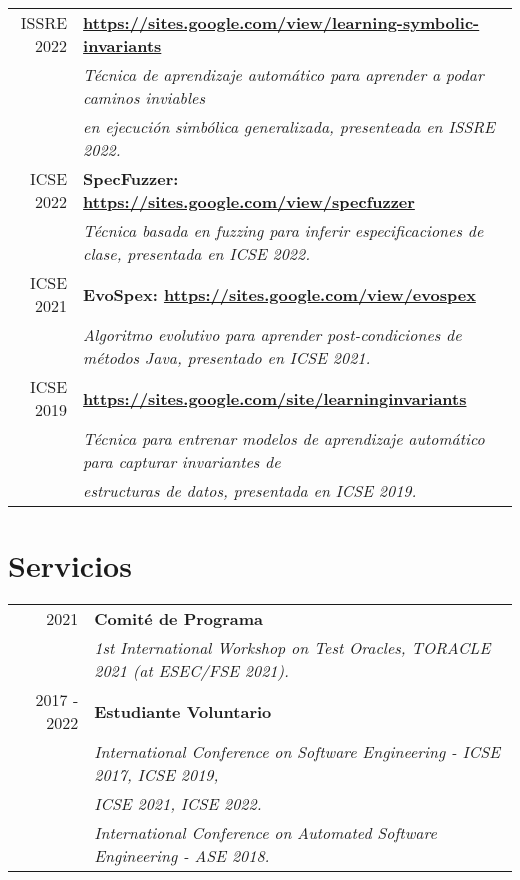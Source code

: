 \documentclass[a4paper,10pt]{article} %
\begin{document}
\begin{longtable}{rl}
\textsc{ISSRE 2022} & \textbf{\url{https://sites.google.com/view/learning-symbolic-invariants}} \\
& \textit{Técnica de aprendizaje automático para aprender a podar caminos inviables} \\
& \textit{en ejecución simbólica generalizada, presenteada en ISSRE 2022.} \\

\textsc{ICSE 2022} & \textbf{SpecFuzzer: \url{https://sites.google.com/view/specfuzzer}} \\
& \textit{Técnica basada en fuzzing para inferir especificaciones de clase, presentada en ICSE 2022.} \\

\textsc{ICSE 2021} & \textbf{EvoSpex: \url{https://sites.google.com/view/evospex}} \\
& \textit{Algoritmo evolutivo para aprender post-condiciones de métodos Java, presentado en ICSE 2021.} \\

\textsc{ICSE 2019} & \textbf{\url{https://sites.google.com/site/learninginvariants}} \\
& \textit{Técnica para entrenar modelos de aprendizaje automático para capturar invariantes de} \\ 
& \textit{estructuras de datos, presentada en ICSE 2019.} \\

\end{longtable}

\section{Servicios}

\begin{longtable}{rl}
\textsc{2021}   & \textbf{Comité de Programa} \\
& \textit{1st International Workshop on Test Oracles, TORACLE 2021 (at ESEC/FSE 2021).} \\

\textsc{2017 - 2022} & \textbf{Estudiante Voluntario} \\
& \textit{International Conference on Software Engineering - ICSE 2017, ICSE 2019,} \\
& \textit{ICSE 2021, ICSE 2022.} \\
& \textit{International Conference on Automated Software Engineering - ASE 2018.} \\

\end{longtable}
\end{document}
